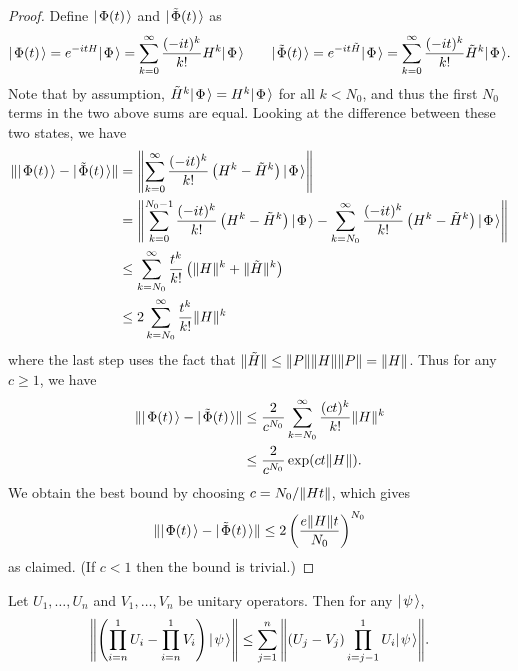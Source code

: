 \documentclass[../thesis-main/thesis-main]{subfiles}
\begin{document}
\begin{proof}
Define $|\mspace{2mu} \Phi(t) \mspace{2mu} \rangle$ and $|\mspace{2mu} \tilde\Phi(t) \mspace{2mu} \rangle$
as
\[
|\mspace{2mu} \Phi(t) \mspace{2mu} \rangle=e^{-itH}|\mspace{2mu} \Phi \mspace{2mu} \rangle=\sum_{k=0}^{\infty}\frac{(-it)^{k}}{k!}H^{k}|\mspace{2mu} \Phi \mspace{2mu} \rangle\qquad|\mspace{2mu} \tilde\Phi(t) \mspace{2mu} \rangle=e^{-it\tilde{H}}|\mspace{2mu} \Phi \mspace{2mu} \rangle=\sum_{k=0}^{\infty}\frac{(-it)^{k}}{k!}\tilde{H}^{k}|\mspace{2mu} \Phi \mspace{2mu} \rangle.
\]
Note that by assumption, $\tilde{H}^{k}|\mspace{2mu} \Phi \mspace{2mu} \rangle=H^{k}|\mspace{2mu} \Phi \mspace{2mu} \rangle$ for all $k< N_0$, and thus the first $N_0$ terms in the two above sums are equal. Looking at the difference between these two states, we have
\begin{align*}
\|{|\mspace{2mu} \Phi(t) \mspace{2mu} \rangle-|\mspace{2mu} \tilde\Phi(t) \mspace{2mu} \rangle}\| & =\left\|{\sum_{k=0}^{\infty}\frac{(-it)^{k}}{k!}\left(H^{k}-\tilde{H}^{k}\right)|\mspace{2mu} \Phi \mspace{2mu} \rangle}\right\|\\
 & =\left\|{\sum_{k=0}^{N_0-1}\frac{(-it)^{k}}{k!}\left(H^{k}-\tilde{H}^{k}\right)|\mspace{2mu} \Phi \mspace{2mu} \rangle-\sum_{k=N_0}^{\infty}\frac{(-it)^{k}}{k!}\left(H^{k}-\tilde{H}^{k}\right)|\mspace{2mu} \Phi \mspace{2mu} \rangle}\right\|\\
 & \leq\sum_{k=N_0}^{\infty}\frac{t^{k}}{k!}\left(\|{H}\|^{k}+\|{\tilde{H}}\|^{k}\right) \\
 & \leq 2\sum_{k=N_0}^{\infty}\frac{t^{k}}{k!} \|{H}\|^{k}
\end{align*}
where the last step uses the fact that $\|{\tilde{H}}\|\leq\|{P}\|\|{H}\|\|{P}\| = \|{H}\|$.  Thus for any $c \ge 1$, we have
\begin{align*}
\|{|\mspace{2mu} \Phi(t) \mspace{2mu} \rangle-|\mspace{2mu} \tilde\Phi(t) \mspace{2mu} \rangle}\|
 & \leq\frac{2}{c^{N_0}}\sum_{k=N_0}^{\infty}\frac{(ct)^{k}}{k!}\|{H}\|^{k}\\
 & \leq\frac{2}{c^{N_0}}\exp(ct\|{H}\|).
\end{align*}
We obtain the best bound by choosing $c=N_0/\|{Ht}\|$, which gives
\[
  \|{|\mspace{2mu} \Phi(t) \mspace{2mu} \rangle-|\mspace{2mu} \tilde\Phi(t) \mspace{2mu} \rangle}\|
  \le 2\left(\frac{e\|{H}\|t}{N_0}\right)^{N_0}
\]
as claimed.  (If $c < 1$ then the bound is trivial.)
\end{proof}

\begin{proposition}
\label{pro:hybrid}Let $U_1,\ldots, U_n$ and $V_1,\ldots, V_n$  be unitary operators.  Then for any $|\mspace{2mu} \psi \mspace{2mu} \rangle$,
\begin{equation}
  \left\|{\left(\prod_{i=n}^1 U_i - \prod_{i=n}^1 V_i \right) |\mspace{2mu} \psi \mspace{2mu} \rangle}\right\|   \le \sum_{j=1}^n \Bigg\|{(U_j - V_j)\prod_{i=j-1}^1 U_i |\mspace{2mu} \psi \mspace{2mu} \rangle}\Bigg\|.
\end{equation}
\end{proposition}
\end{document}
